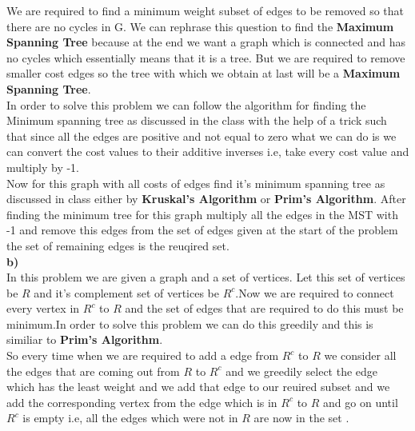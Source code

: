\documentclass{extarticle}
\theoremstyle{remark}
\newcommand{\tbf}[1]{\textbf{#1}}
\begin{document}
We are required to find a minimum weight subset of edges to be removed so that there are no cycles in G.
We can rephrase this question to find the \tbf{Maximum Spanning Tree} because at the end we want
a graph which is connected and has no cycles which essentially means that it is a tree.
But we are required to remove smaller cost edges so the tree with which we obtain at last 
will be a \tbf{Maximum Spanning Tree}.\\
In order to solve this problem we can follow the algorithm for finding the Minimum spanning tree
as discussed in the class with the help of a trick such that since all the edges are positive
and not equal to zero what we can do is we can convert the cost values to their
additive inverses i.e, take every cost value and multiply by -1.\\
Now for this graph with all costs of edges find it's minimum spanning tree as discussed in 
class either by \tbf{Kruskal's Algorithm} or \tbf{Prim's Algorithm}. After finding the minimum tree for 
this graph multiply all the edges in the MST with -1 and remove this edges from the 
set of edges given at the start of the problem the set of remaining edges is the reuqired set.\\

\tbf{b)}\\

In this problem we are given a graph and a set of vertices. Let this set of vertices be $R$
and it's complement set of vertices be $R^{c}$.Now we are required to connect every vertex in
$R^{c}$ to $R$ and the set of edges that are required to do this must be minimum.In order 
to solve this problem we can do this greedily and this is similiar to \tbf{Prim's Algorithm}.\\
So every time when we are required to add a edge from $R^{c}$ to $R$ we consider all the edges 
that are coming out from $R$ to $R^{c}$ and we greedily select the edge which has the least 
weight and we add that edge to our reuired subset and we add the corresponding vertex from the 
edge which is in $R^{c}$ to $R$ and go on until $R^{c}$ is empty i.e, all the edges which 
were not in $R$ are now in the set .
\end{document}

